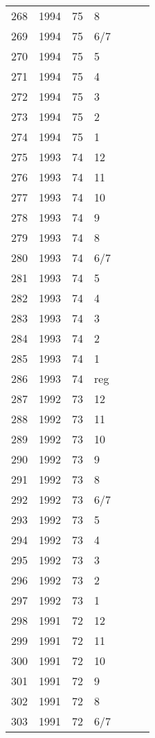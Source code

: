 \begin{longtable}{ |l|l|l|l|l|l|l| }
268 & 1994 & 75 & 8 &  &  &  \\
269 & 1994 & 75 & 6/7 &  &  &  \\
270 & 1994 & 75 & 5 &  &  &  \\
271 & 1994 & 75 & 4 &  &  &  \\
272 & 1994 & 75 & 3 &  &  &  \\
273 & 1994 & 75 & 2 &  &  &  \\
274 & 1994 & 75 & 1 &  &  &  \\
275 & 1993 & 74 & 12 &  &  &  \\
276 & 1993 & 74 & 11 &  &  &  \\
277 & 1993 & 74 & 10 &  &  &  \\
278 & 1993 & 74 & 9 &  &  &  \\
279 & 1993 & 74 & 8 &  &  &  \\
280 & 1993 & 74 & 6/7 &  &  &  \\
281 & 1993 & 74 & 5 &  &  &  \\
282 & 1993 & 74 & 4 &  &  &  \\
283 & 1993 & 74 & 3 &  &  &  \\
284 & 1993 & 74 & 2 &  &  &  \\
285 & 1993 & 74 & 1 &  &  &  \\
286 & 1993 & 74 & reg &  &  &  \\
287 & 1992 & 73 & 12 &  &  &  \\
288 & 1992 & 73 & 11 &  &  &  \\
289 & 1992 & 73 & 10 &  &  &  \\
290 & 1992 & 73 & 9 &  &  &  \\
291 & 1992 & 73 & 8 &  &  &  \\
292 & 1992 & 73 & 6/7 &  &  &  \\
293 & 1992 & 73 & 5 &  &  &  \\
294 & 1992 & 73 & 4 &  &  &  \\
295 & 1992 & 73 & 3 &  &  &  \\
296 & 1992 & 73 & 2 &  &  &  \\
297 & 1992 & 73 & 1 &  &  &  \\
298 & 1991 & 72 & 12 &  &  &  \\
299 & 1991 & 72 & 11 &  &  &  \\
300 & 1991 & 72 & 10 &  &  &  \\
301 & 1991 & 72 & 9 &  &  &  \\
302 & 1991 & 72 & 8 &  &  &  \\
303 & 1991 & 72 & 6/7 &  &  &  \\

\end{longtable}
